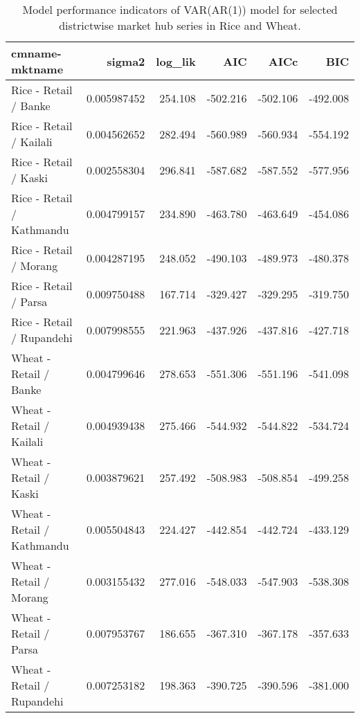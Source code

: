 \documentclass[
  12pt,
]{article}
\begin{document}
\begin{longtable}[t]{lrrrrr}
\caption{\label{tab:retail-var-fit-tidy}Model performance indicators of VAR(AR(1)) model for selected districtwise market hub series in Rice and Wheat.}\\
\toprule
cmname-mktname & sigma2 & log\_lik & AIC & AICc & BIC\\
\midrule
Rice - Retail / Banke & 0.005987452 & 254.108 & -502.216 & -502.106 & -492.008\\
Rice - Retail / Kailali & 0.004562652 & 282.494 & -560.989 & -560.934 & -554.192\\
Rice - Retail / Kaski & 0.002558304 & 296.841 & -587.682 & -587.552 & -577.956\\
Rice - Retail / Kathmandu & 0.004799157 & 234.890 & -463.780 & -463.649 & -454.086\\
Rice - Retail / Morang & 0.004287195 & 248.052 & -490.103 & -489.973 & -480.378\\
\addlinespace
Rice - Retail / Parsa & 0.009750488 & 167.714 & -329.427 & -329.295 & -319.750\\
Rice - Retail / Rupandehi & 0.007998555 & 221.963 & -437.926 & -437.816 & -427.718\\
Wheat - Retail / Banke & 0.004799646 & 278.653 & -551.306 & -551.196 & -541.098\\
Wheat - Retail / Kailali & 0.004939438 & 275.466 & -544.932 & -544.822 & -534.724\\
Wheat - Retail / Kaski & 0.003879621 & 257.492 & -508.983 & -508.854 & -499.258\\
\addlinespace
Wheat - Retail / Kathmandu & 0.005504843 & 224.427 & -442.854 & -442.724 & -433.129\\
Wheat - Retail / Morang & 0.003155432 & 277.016 & -548.033 & -547.903 & -538.308\\
Wheat - Retail / Parsa & 0.007953767 & 186.655 & -367.310 & -367.178 & -357.633\\
Wheat - Retail / Rupandehi & 0.007253182 & 198.363 & -390.725 & -390.596 & -381.000\\
\bottomrule
\end{longtable}
\end{document}
